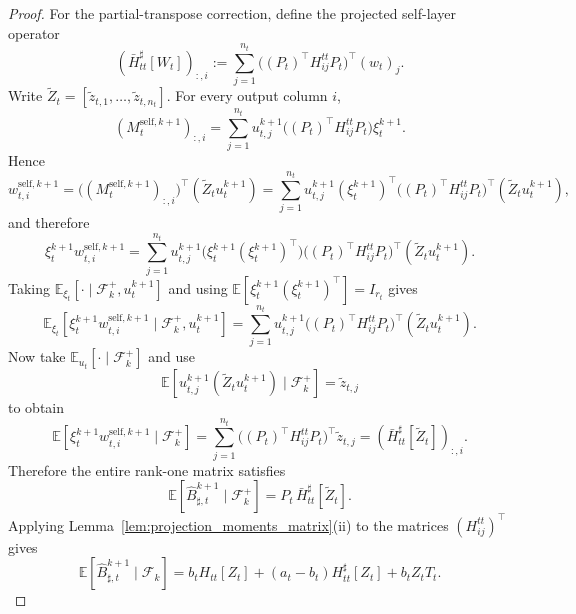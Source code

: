 \documentclass{pkumelon}
\theoremstyle{plain}
\newcommand{\E}{\mathbb{E}}
\begin{document}
\begin{proof}
For the partial-transpose correction, define the projected self-layer operator
\begin{equation*}
(\bar H_{tt}^\sharp[W_t])_{:,i} := \sum_{j=1}^{n_t}\bigl((P_t)^\top H_{ij}^{tt}P_t\bigr)^\top (w_t)_j.
\end{equation*}
Write $\tilde Z_t=[\tilde z_{t,1},\ldots,\tilde z_{t,n_t}]$. For every output column $i$,
\begin{equation*}
(M_t^{\mathrm{self},k+1})_{:,i} = \sum_{j=1}^{n_t}u_{t,j}^{k+1}\bigl((P_t)^\top H_{ij}^{tt}P_t\bigr)\xi_t^{k+1}.
\end{equation*}
Hence
\begin{equation*}
w_{t,i}^{\mathrm{self},k+1}=
\bigl((M_t^{\mathrm{self},k+1})_{:,i}\bigr)^\top(\tilde Z_t u_t^{k+1}) =\sum_{j=1}^{n_t}u_{t,j}^{k+1}
(\xi_t^{k+1})^\top
\bigl((P_t)^\top H_{ij}^{tt}P_t\bigr)^\top
(\tilde Z_t u_t^{k+1}),
\end{equation*}
and therefore
\begin{equation*}
\xi_t^{k+1}w_{t,i}^{\mathrm{self},k+1} = \sum_{j=1}^{n_t}u_{t,j}^{k+1} \bigl(\xi_t^{k+1}(\xi_t^{k+1})^\top\bigr) \bigl((P_t)^\top H_{ij}^{tt}P_t\bigr)^\top (\tilde Z_t u_t^{k+1}).
\end{equation*}
Taking $\E_{\xi_t}[\cdot\mid \mathcal F_k^+,u_t^{k+1}]$ and using $\E[\xi_t^{k+1}(\xi_t^{k+1})^\top]=I_{r_t}$ gives
\begin{equation*}
\E_{\xi_t}\!\left[\xi_t^{k+1}w_{t,i}^{\mathrm{self},k+1}\mid \mathcal F_k^+,u_t^{k+1}\right] = \sum_{j=1}^{n_t}u_{t,j}^{k+1} \bigl((P_t)^\top H_{ij}^{tt}P_t\bigr)^\top (\tilde Z_t u_t^{k+1}).
\end{equation*}
Now take $\E_{u_t}[\cdot\mid \mathcal F_k^+]$ and use
\begin{equation*}
\E\!\left[u_{t,j}^{k+1}(\tilde Z_t u_t^{k+1})\mid \mathcal F_k^+\right] = \tilde z_{t,j}
\end{equation*}
to obtain
\begin{equation*}
\E\!\left[\xi_t^{k+1}w_{t,i}^{\mathrm{self},k+1}\mid \mathcal F_k^+\right] = \sum_{j=1}^{n_t} \bigl((P_t)^\top H_{ij}^{tt}P_t\bigr)^\top \tilde z_{t,j} = (\bar H_{tt}^\sharp[\tilde Z_t])_{:,i}.
\end{equation*}
Therefore the entire rank-one matrix satisfies
\begin{equation}\label{eq:EBt_given_P_active}
\E[\widehat B_{\sharp,t}^{k+1}\mid \mathcal F_k^+]
=
P_t\,\bar H_{tt}^\sharp[\tilde Z_t].
\end{equation}
Applying Lemma~\ref{lem:projection_moments_matrix}(ii) to the matrices $(H_{ij}^{tt})^\top$ gives
\begin{equation}\label{eq:EBt_total_active}
\E[\widehat B_{\sharp,t}^{k+1}\mid \mathcal F_k]
=
b_t H_{tt}[Z_t]
+(a_t-b_t)H_{tt}^\sharp[Z_t]
+b_t Z_tT_t.
\end{equation}


\end{proof}
\end{document}
